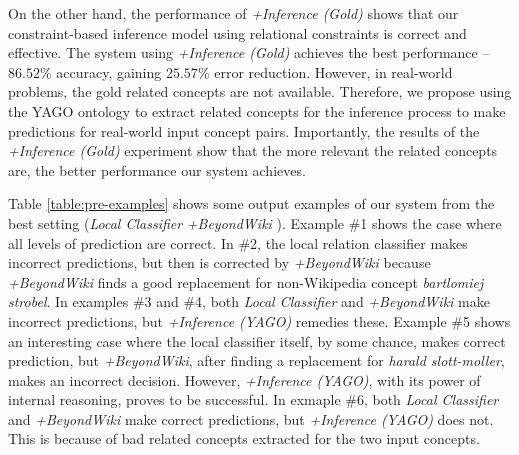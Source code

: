 On the other hand, the performance of {\em +Inference (Gold)} shows
that our constraint-based inference model using relational constraints
is correct and effective. The system using {\em +Inference (Gold)}
achieves the best performance -- $86.52\%$ accuracy, gaining $25.57\%$
error reduction. However, in real-world problems, the gold related
concepts are not available. Therefore, we propose using the YAGO
ontology to extract related concepts for the inference process to make
predictions for real-world input concept pairs. Importantly, the results
of the {\em +Inference (Gold)} experiment show that the more relevant
the related concepts are, the better performance our system achieves.

Table \ref{table:pre-examples} shows some output examples of our
system from the best setting ({\em Local Classifier} {\em +BeyondWiki}
).  Example \#1 shows the case where
all levels of prediction are correct. In \#2, the local relation classifier
makes incorrect predictions, but then is corrected by {\em +BeyondWiki}
because {\em +BeyondWiki} finds a good replacement for non-Wikipedia
concept {\em bartlomiej strobel}. In examples \#3 and \#4, both {\em
  Local Classifier} and {\em +BeyondWiki} make incorrect predictions, but
{\em +Inference (YAGO)} remedies these. Example \#5 shows an
interesting case where the local classifier itself, by some chance,
makes correct prediction, but {\em +BeyondWiki}, after finding a
replacement for {\em harald slott-moller}, makes an incorrect
decision. However, {\em +Inference (YAGO)}, with its power of internal
reasoning, proves to be successful. In exmaple \#6, both {\em
  Local Classifier} and {\em +BeyondWiki} make correct predictions, but
{\em +Inference (YAGO)} does not. This is because of bad related
concepts extracted for the two input concepts.

